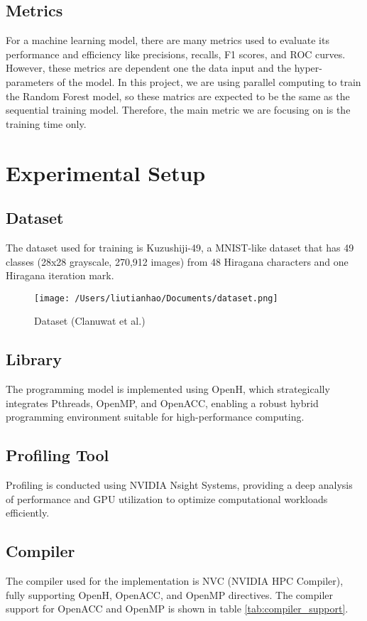 \documentclass[13pt]{article}
\begin{document}
\subsection{Metrics}
For a machine learning model, there are many metrics used to evaluate its performance and efficiency like precisions, recalls, F1 scores, and ROC curves.
However, these metrics are dependent one the data input and the hyper-parameters of the model.
In this project, we are using parallel computing to train the Random Forest model, so these matrics are expected to be the same as the sequential training model.
Therefore, the main metric we are focusing on is the training time only.

\section{Experimental Setup}

\subsection{Dataset}
The dataset used for training is Kuzushiji-49, a MNIST-like dataset that has 49 classes (28x28 grayscale, 270,912 images) from 48 Hiragana characters and one Hiragana iteration mark.

    \begin{figure}[h!]
        \centering
        \texttt{[image: /Users/liutianhao/Documents/dataset.png]}
        \caption{Dataset (Clanuwat et al.)\cite{paper4}}
        \label{fig:dataset}
    \end{figure}

\subsection{Library}
The programming model is implemented using OpenH, which strategically integrates Pthreads, OpenMP, and OpenACC, enabling a robust hybrid programming environment suitable for high-performance computing.

\subsection{Profiling Tool}
Profiling is conducted using NVIDIA Nsight Systems, providing a deep analysis of performance and GPU utilization to optimize computational workloads efficiently.

\subsection{Compiler}
The compiler used for the implementation is NVC (NVIDIA HPC Compiler), fully supporting OpenH, OpenACC, and OpenMP directives.  
The compiler support for OpenACC and OpenMP is shown in table \ref{tab:compiler_support}.
\end{document}
